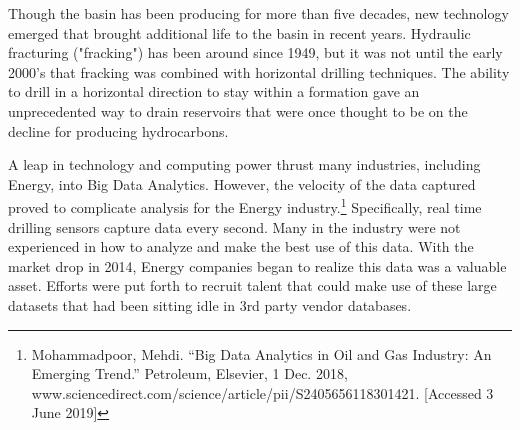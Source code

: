 \documentclass{llncs}
\begin{document}
Though the basin has been producing for more than five decades, new technology emerged that brought additional life to the basin in recent years. Hydraulic fracturing ("fracking") has been around since 1949, but it was not until the early 2000’s that fracking was combined with  horizontal drilling techniques. The ability to drill in a horizontal direction to stay within a formation gave an unprecedented way to drain reservoirs that were once thought to be on the decline for producing hydrocarbons.

A leap in technology and computing power thrust many industries, including Energy, into Big Data Analytics. However, the velocity of the data captured proved to complicate analysis for the Energy industry.\footnote[3] {Mohammadpoor, Mehdi. “Big Data Analytics in Oil and Gas Industry: An Emerging Trend.” Petroleum, Elsevier, 1 Dec. 2018, www.sciencedirect.com/science/article/pii/S2405656118301421. [Accessed 3 June 2019]} Specifically, real time drilling sensors capture data every second. Many in the industry were not experienced in how to analyze and make the best use of this data. With the market drop in 2014, Energy companies began to realize this data was a valuable asset. Efforts were put forth to recruit talent that could make use of these large datasets that had been sitting idle in 3rd party vendor databases.


%
%
%
 
 

\end{document}
